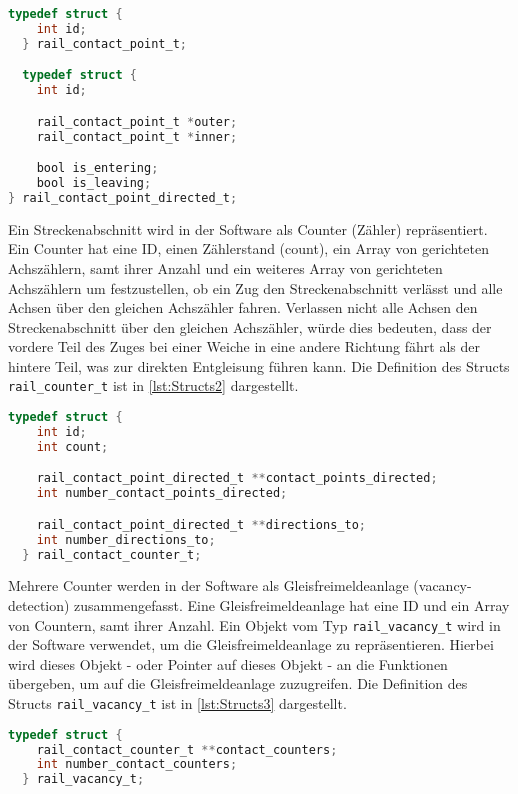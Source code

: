 \begin{lstlisting}[caption={Definition der Structs},label={lst:Structs},language=C]
  typedef struct {
    int id;
  } rail_contact_point_t;

  typedef struct {
    int id;

    rail_contact_point_t *outer;
    rail_contact_point_t *inner;

    bool is_entering;
    bool is_leaving;
} rail_contact_point_directed_t;
\end{lstlisting}

Ein Streckenabschnitt wird in der Software als Counter (Zähler) repräsentiert. Ein Counter hat eine ID, einen Zählerstand (count), ein Array von gerichteten Achszählern, samt ihrer Anzahl und ein weiteres Array von gerichteten Achszählern um festzustellen, ob ein Zug den Streckenabschnitt verlässt und alle Achsen über den gleichen Achszähler fahren. Verlassen nicht alle Achsen den Streckenabschnitt über den gleichen Achszähler, würde dies bedeuten, dass der vordere Teil des Zuges bei einer Weiche in eine andere Richtung fährt als der hintere Teil, was zur direkten Entgleisung führen kann. Die Definition des Structs \texttt{rail\_counter\_t} ist in \autoref{lst:Structs2} dargestellt.

\begin{lstlisting}[caption={Definition des Structs rail\_counter\_t},label={lst:Structs2},language=C]
  typedef struct {
    int id;
    int count;

    rail_contact_point_directed_t **contact_points_directed;
    int number_contact_points_directed;

    rail_contact_point_directed_t **directions_to;
    int number_directions_to;
  } rail_contact_counter_t;
\end{lstlisting}

Mehrere Counter werden in der Software als Gleisfreimeldeanlage (vacancy-detection) zusammengefasst. Eine Gleisfreimeldeanlage hat eine ID und ein Array von Countern, samt ihrer Anzahl. Ein Objekt vom Typ \texttt{rail\_vacancy\_t} wird in der Software verwendet, um die Gleisfreimeldeanlage zu repräsentieren. Hierbei wird dieses Objekt - oder Pointer auf dieses Objekt - an die Funktionen übergeben, um auf die Gleisfreimeldeanlage zuzugreifen. Die Definition des Structs \texttt{rail\_vacancy\_t} ist in \autoref{lst:Structs3} dargestellt.

\begin{lstlisting}[caption={Definition des Structs rail\_vacancy\_t},label={lst:Structs3},language=C]
  typedef struct {
    rail_contact_counter_t **contact_counters;
    int number_contact_counters;
  } rail_vacancy_t;
\end{lstlisting}

